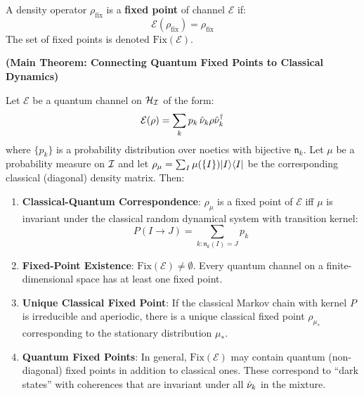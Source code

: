\begin{definition}
\label{def:channel-fixed-point}
A density operator $\rho_{\mathrm{fix}}$ is a \textbf{fixed point} of channel $\mathcal{E}$ if:
\[
\mathcal{E}(\rho_{\mathrm{fix}}) = \rho_{\mathrm{fix}}
\]
The set of fixed points is denoted $\mathrm{Fix}(\mathcal{E})$.
\end{definition}

\begin{theorem}
\label{thm:channel-classical-attractor}
\textbf{(Main Theorem: Connecting Quantum Fixed Points to Classical Dynamics)}

Let $\mathcal{E}$ be a quantum channel on $\mathcal{H}_{\mathcal{I}}$ of the form:
\[
\mathcal{E}(\rho) = \sum_{k} p_k \, \hat{\nu}_k \rho \hat{\nu}_k^\dagger
\]
where $\{p_k\}$ is a probability distribution over noetics with bijective $\mathfrak{n}_k$. Let $\mu$ be a probability measure on $\mathcal{I}$ and let $\rho_\mu = \sum_I \mu(\{I\}) |I\rangle\langle I|$ be the corresponding classical (diagonal) density matrix. Then:

\begin{enumerate}
  \item \textbf{Classical-Quantum Correspondence}: $\rho_\mu$ is a fixed point of $\mathcal{E}$ iff $\mu$ is invariant under the classical random dynamical system with transition kernel:
  \[
  P(I \to J) = \sum_{k : \mathfrak{n}_k(I) = J} p_k
  \]

  \item \textbf{Fixed-Point Existence}: $\mathrm{Fix}(\mathcal{E}) \neq \emptyset$. Every quantum channel on a finite-dimensional space has at least one fixed point.

  \item \textbf{Unique Classical Fixed Point}: If the classical Markov chain with kernel $P$ is irreducible and aperiodic, there is a unique classical fixed point $\rho_{\mu_*}$ corresponding to the stationary distribution $\mu_*$.

  \item \textbf{Quantum Fixed Points}: In general, $\mathrm{Fix}(\mathcal{E})$ may contain quantum (non-diagonal) fixed points in addition to classical ones. These correspond to ``dark states'' with coherences that are invariant under all $\hat{\nu}_k$ in the mixture.
\end{enumerate}
\end{theorem}

